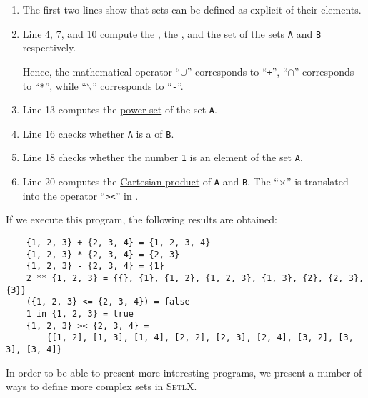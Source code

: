 \begin{enumerate}
\item The first two lines show that sets can be defined as explicit  of their elements.
\item Line 4, 7, and 10 compute the , the , and the set  of the sets
      \texttt{A} and \texttt{B} respectively.

      Hence, the mathematical operator ``$\cup$'' corresponds to ``\texttt{+}'', ``$\cap$''
      corresponds to ``\texttt{*}'', while ``$\backslash$'' corresponds to ``\texttt{-}''.
\item Line 13 computes the \href{https://en.wikipedia.org/wiki/Power_set}{power set} of the set
      \texttt{A}.
\item Line 16 checks whether \texttt{A} is a  of \texttt{B}.
\item Line 18 checks whether the number \texttt{1} is an element of the set \texttt{A}.
\item Line 20 computes the \href{https://en.wikipedia.org/wiki/Cartesian_product}{Cartesian product}
      of \texttt{A} and \texttt{B}.  The  ``$\times$'' is translated into the operator
      ``\texttt{><}'' in \setl.
\end{enumerate}
If we execute this program, the following results are obtained:
\begin{verbatim}
    {1, 2, 3} + {2, 3, 4} = {1, 2, 3, 4}
    {1, 2, 3} * {2, 3, 4} = {2, 3}
    {1, 2, 3} - {2, 3, 4} = {1}
    2 ** {1, 2, 3} = {{}, {1}, {1, 2}, {1, 2, 3}, {1, 3}, {2}, {2, 3}, {3}}
    ({1, 2, 3} <= {2, 3, 4}) = false
    1 in {1, 2, 3} = true
    {1, 2, 3} >< {2, 3, 4} = 
        {[1, 2], [1, 3], [1, 4], [2, 2], [2, 3], [2, 4], [3, 2], [3, 3], [3, 4]}

\end{verbatim}
In order to be able to present more interesting programs, we present a number of ways to define
more complex sets in  \textsc{SetlX}.

